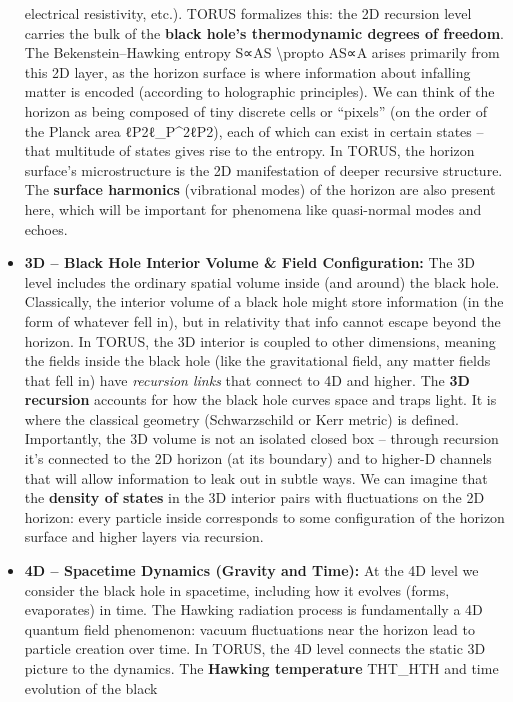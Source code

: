 \documentclass[]{article}
\begin{document}
\begin{itemize}
  electrical resistivity, etc.). TORUS formalizes this: the 2D recursion
  level carries the bulk of the \textbf{black hole's thermodynamic
  degrees of freedom}. The Bekenstein--Hawking entropy S∝AS
  \textbackslash{}propto AS∝A arises primarily from this 2D layer, as
  the horizon surface is where information about infalling matter is
  encoded (according to holographic principles). We can think of the
  horizon as being composed of tiny discrete cells or ``pixels'' (on the
  order of the Planck area ℓP2ℓ\_P\^{}2ℓP2​), each of which can exist in
  certain states -- that multitude of states gives rise to the entropy.
  In TORUS, the horizon surface's microstructure is the 2D manifestation
  of deeper recursive structure. The \textbf{surface harmonics}
  (vibrational modes) of the horizon are also present here, which will
  be important for phenomena like quasi-normal modes and echoes.
\item
  \textbf{3D -- Black Hole Interior Volume \& Field Configuration:} The
  3D level includes the ordinary spatial volume inside (and around) the
  black hole. Classically, the interior volume of a black hole might
  store information (in the form of whatever fell in), but in relativity
  that info cannot escape beyond the horizon. In TORUS, the 3D interior
  is coupled to other dimensions, meaning the fields inside the black
  hole (like the gravitational field, any matter fields that fell in)
  have \emph{recursion links} that connect to 4D and higher. The
  \textbf{3D recursion} accounts for how the black hole curves space and
  traps light. It is where the classical geometry (Schwarzschild or Kerr
  metric) is defined. Importantly, the 3D volume is not an isolated
  closed box -- through recursion it's connected to the 2D horizon (at
  its boundary) and to higher-D channels that will allow information to
  leak out in subtle ways. We can imagine that the \textbf{density of
  states} in the 3D interior pairs with fluctuations on the 2D horizon:
  every particle inside corresponds to some configuration of the horizon
  surface and higher layers via recursion.
\item
  \textbf{4D -- Spacetime Dynamics (Gravity and Time):} At the 4D level
  we consider the black hole in spacetime, including how it evolves
  (forms, evaporates) in time. The Hawking radiation process is
  fundamentally a 4D quantum field phenomenon: vacuum fluctuations near
  the horizon lead to particle creation over time. In TORUS, the 4D
  level connects the static 3D picture to the dynamics. The
  \textbf{Hawking temperature} THT\_HTH​ and time evolution of the black

\end{itemize}
\end{document}
